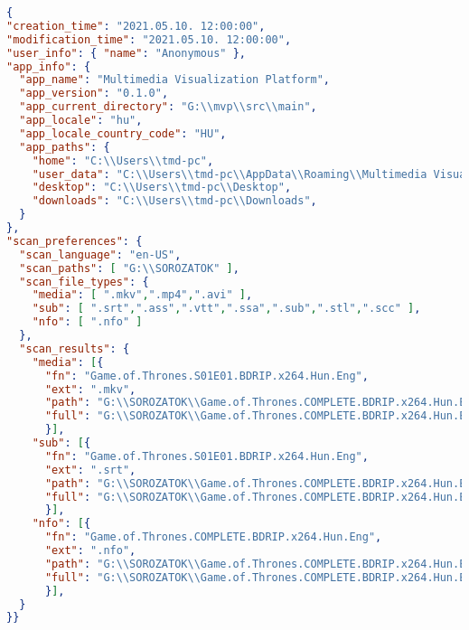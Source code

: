 \begin{lstlisting}[language={json}]
{
"creation_time": "2021.05.10. 12:00:00",
"modification_time": "2021.05.10. 12:00:00",
"user_info": { "name": "Anonymous" },
"app_info": {
  "app_name": "Multimedia Visualization Platform",
  "app_version": "0.1.0",
  "app_current_directory": "G:\\mvp\\src\\main",
  "app_locale": "hu",
  "app_locale_country_code": "HU",
  "app_paths": {
    "home": "C:\\Users\\tmd-pc",
    "user_data": "C:\\Users\\tmd-pc\\AppData\\Roaming\\Multimedia Visualization Platform",
    "desktop": "C:\\Users\\tmd-pc\\Desktop",
    "downloads": "C:\\Users\\tmd-pc\\Downloads",
  }
},
"scan_preferences": {
  "scan_language": "en-US",
  "scan_paths": [ "G:\\SOROZATOK" ],
  "scan_file_types": {
    "media": [ ".mkv",".mp4",".avi" ],
    "sub": [ ".srt",".ass",".vtt",".ssa",".sub",".stl",".scc" ],
    "nfo": [ ".nfo" ]
  },
  "scan_results": {
    "media": [{
      "fn": "Game.of.Thrones.S01E01.BDRIP.x264.Hun.Eng",
      "ext": ".mkv",
      "path": "G:\\SOROZATOK\\Game.of.Thrones.COMPLETE.BDRIP.x264.Hun.Eng",
      "full": "G:\\SOROZATOK\\Game.of.Thrones.COMPLETE.BDRIP.x264.Hun.Eng\\Game.of.Thrones.S01E01.BDRIP.x264.Hun.Eng.mkv"
      }],
    "sub": [{
      "fn": "Game.of.Thrones.S01E01.BDRIP.x264.Hun.Eng",
      "ext": ".srt",
      "path": "G:\\SOROZATOK\\Game.of.Thrones.COMPLETE.BDRIP.x264.Hun.Eng",
      "full": "G:\\SOROZATOK\\Game.of.Thrones.COMPLETE.BDRIP.x264.Hun.Eng\\Game.of.Thrones.S01E01.BDRIP.x264.Hun.Eng.srt"
      }],
    "nfo": [{
      "fn": "Game.of.Thrones.COMPLETE.BDRIP.x264.Hun.Eng",
      "ext": ".nfo",
      "path": "G:\\SOROZATOK\\Game.of.Thrones.COMPLETE.BDRIP.x264.Hun.Eng",
      "full": "G:\\SOROZATOK\\Game.of.Thrones.COMPLETE.BDRIP.x264.Hun.Eng\\Game.of.Thrones.COMPLETE.BDRIP.x264.Hun.Eng.nfo"
      }],
  }
}}
\end{lstlisting}


